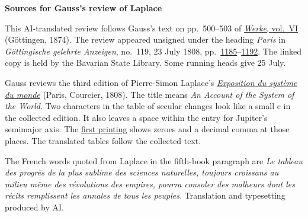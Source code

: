 \clearpage\thispagestyle{empty}
\begin{center}\textbf{Sources for Gauss’s review of Laplace}\end{center}
\noindent This AI-translated review follows Gauss’s text on pp.~500--503 of \href{https://gdz.sub.uni-goettingen.de/id/PPN236007467}{\textit{Werke}, vol.~VI} (Göttingen, 1874). The review appeared unsigned under the heading \emph{Paris} in \textit{Göttingische gelehrte Anzeigen}, no.~119, 23 July 1808, pp.~\href{https://api.digitale-sammlungen.de/iiif/image/v2/bsb10538674_00155/full/1800,/0/default.jpg}{1185}--\href{https://api.digitale-sammlungen.de/iiif/image/v2/bsb10538674_00162/full/1800,/0/default.jpg}{1192}. The linked copy is held by the Bavarian State Library. Some running heads give 25 July.
\par\smallskip\noindent Gauss reviews the third edition of Pierre-Simon Laplace’s \href{https://www.loc.gov/item/17002967/}{\textit{Exposition du système du monde}} (Paris, Courcier, 1808). The title means \emph{An Account of the System of the World}. Two characters in the table of secular changes look like a small c in the collected edition. It also leaves a space within the entry for Jupiter’s semimajor axis. The \href{https://api.digitale-sammlungen.de/iiif/image/v2/bsb10538674_00159/full/1800,/0/default.jpg}{first printing} shows zeroes and a decimal comma at those places. The translated tables follow the collected text.
\par\smallskip\noindent The French words quoted from Laplace in the fifth-book paragraph are \emph{Le tableau des progrès de la plus sublime des sciences naturelles, toujours croissans au milieu même des révolutions des empires, pourra consoler des malheurs dont les récits remplissent les annales de tous les peuples.} Translation and typesetting produced by AI.
\clearpage
